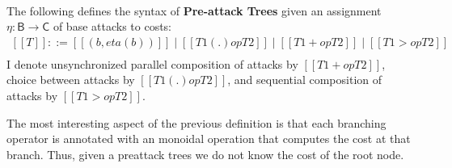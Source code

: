 \begin{definition}
  \ \\
  \noindent
  The following defines the syntax of \textbf{Pre-attack Trees} given an
  assignment $\eta : \mathsf{B} \to \mathsf{C}$ of base attacks
  to costs:
  \[
  \begin{array}{lll}
    [[T]] ::= [[(b, eta(b))]] \mid [[T1 (.)op T2]] \mid [[T1 +op T2]] \mid [[T1 >op  T2]]\\
  \end{array}
  \]
  I denote unsynchronized parallel composition of attacks by $[[T1 +op
      T2]]$, choice between attacks by $[[T1 (.)op T2]]$, and sequential
  composition of attacks by $[[T1 >op T2]]$.
\end{definition}
The most interesting aspect of the previous definition is that each
branching operator is annotated with an monoidal operation that
computes the cost at that branch.  Thus, given a preattack trees we do
not know the cost of the root node.

